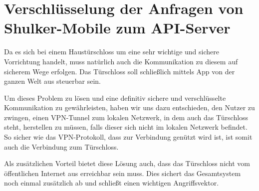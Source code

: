 \section{Verschlüsselung der Anfragen von Shulker-Mobile zum API-Server}
Da es sich bei einem Haustürschloss um eine sehr wichtige und sichere Vorrichtung handelt, muss natürlich auch die
Kommunikation zu diesem auf sicherem Wege erfolgen. Das Türschloss soll schließlich mittels App von der ganzen Welt
aus steuerbar sein.

Um dieses Problem zu lösen und eine definitiv sichere und verschlüsselte Kommunikation zu gewährleisten, haben wir uns dazu 
entschieden, den Nutzer zu zwingen, einen VPN-Tunnel zum lokalen Netzwerk, in dem auch das Türschloss steht, herstellen
zu müssen, falls dieser sich nicht im lokalen Netzwerk befindet. So sicher wie das VPN-Protokoll, dass zur Verbindung genützt
wird ist, ist somit auch die Verbindung zum Türschloss.

Als zusätzlichen Vorteil bietet diese Lösung auch, dass das Türschloss nicht vom öffentlichen Internet aus erreichbar sein muss.
Dies sichert das Gesamtsystem noch einmal zusätzlich ab und schließt einen wichtigen Angriffsvektor. 